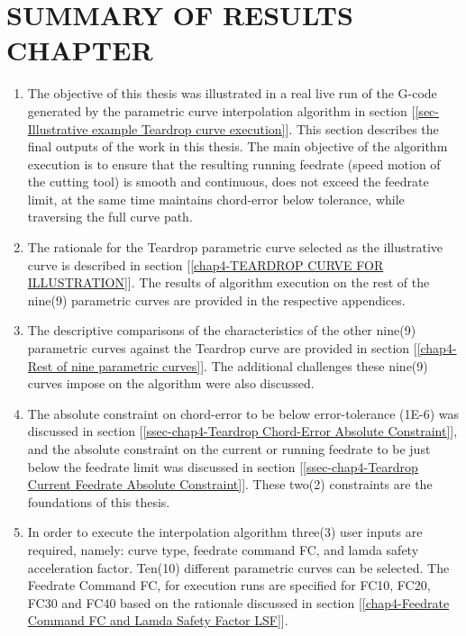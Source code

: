 
\clearpage
\pagebreak

\section{SUMMARY OF RESULTS CHAPTER}

\begin{enumerate}

\item The objective of this thesis was illustrated in a real live run of the G-code generated by the parametric curve interpolation algorithm  in section [\ref{sec-Illustrative example Teardrop curve execution}]. This section describes the final outputs of the work in this thesis. The main objective of the algorithm execution is to ensure that the resulting running feedrate (speed motion of the cutting tool) is smooth and continuous, does not exceed the feedrate limit, at the same time maintains chord-error below tolerance, while traversing the full curve path. 

\item The rationale for the Teardrop parametric curve selected as the illustrative curve is described in section [\ref{chap4-TEARDROP CURVE FOR ILLUSTRATION}]. The results of algorithm execution on the rest of the nine(9) parametric curves are provided in the respective appendices.  

\item The descriptive comparisons of the characteristics of the other nine(9) parametric curves against the Teardrop curve are provided in section [\ref{chap4-Rest of nine parametric curves}]. The additional challenges these nine(9) curves impose on the algorithm were also discussed.  

\item The absolute constraint on chord-error to be below error-tolerance (1E-6) was discussed in section [\ref{ssec-chap4-Teardrop Chord-Error Absolute Constraint}], and the absolute constraint on the current or running feedrate to be just below the feedrate limit was discussed in section [\ref{ssec-chap4-Teardrop Current Feedrate Absolute Constraint}]. These two(2) constraints are the foundations of this thesis.

\item In order to execute the interpolation algorithm three(3) user inputs are required, namely: curve type, feedrate command FC, and lamda safety acceleration factor. Ten(10) different parametric curves can be selected. The Feedrate Command FC, for execution runs are specified for FC10, FC20, FC30 and FC40 based on the rationale discussed in section [\ref{chap4-Feedrate Command FC and Lamda Safety Factor LSF}].   


\end{enumerate}
